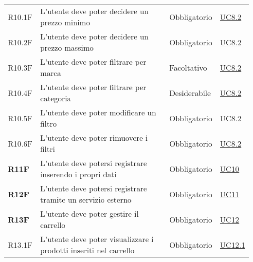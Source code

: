 \begin{center}
\begin{longtable}[!h]{p{50px} p{245px} p{75px} p{50px}}
        R10.1F                                & L'utente deve poter decidere un prezzo minimo                                                              & Obbligatorio             & \hyperref[sec:UC8.2]{UC8.2}                  \\
        R10.2F                                & L'utente deve poter decidere un prezzo massimo                                                             & Obbligatorio             & \hyperref[sec:UC8.2]{UC8.2}                  \\
        R10.3F                                & L'utente deve poter filtrare per marca                                                                     & Facoltativo              & \hyperref[sec:UC8.2]{UC8.2}                  \\
        R10.4F                                & L'utente deve poter filtrare per categoria                                                                 & Desiderabile             & \hyperref[sec:UC8.2]{UC8.2}                  \\
        R10.5F                                & L'utente deve poter modificare un filtro                                                                   & Obbligatorio             & \hyperref[sec:UC8.2]{UC8.2}                  \\
        R10.6F                                & L'utente deve poter rimuovere i filtri                                                                     & Obbligatorio             & \hyperref[sec:UC8.2]{UC8.2}                  \\
        \textbf{R11F}                         & L'utente deve potersi registrare inserendo i propri dati                                                   & Obbligatorio             & \hyperref[sec:UC10]{UC10}                    \\
        \textbf{R12F}                         & L'utente deve potersi registrare tramite un servizio esterno                                               & Obbligatorio             & \hyperref[sec:UC11]{UC11}                    \\
        \textbf{R13F}                         & L'utente deve poter gestire il carrello                                                                    & Obbligatorio             & \hyperref[sec:UC12]{UC12}                    \\
        R13.1F                                & L'utente deve poter visualizzare i prodotti inseriti nel carrello                                          & Obbligatorio             & \hyperref[sec:UC12.1]{UC12.1}                \\

\end{longtable}
\end{center}
